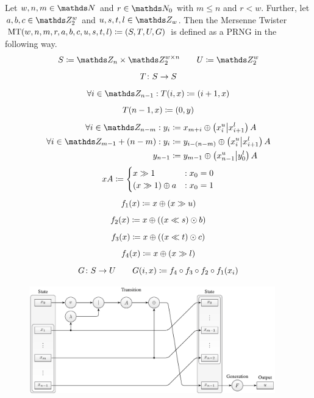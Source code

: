 \documentclass{stdlocal}
\begin{document}
    \begin{definition}
      Let $w, n, m\in \setNatural$ and $r\in\setNatural_0$ with $m \leq n$ and $r < w$.
      Further, let $a,b,c \in \setInteger_2^w$ and $u,s,t,l \in \setInteger_w$.
      Then the Mersenne Twister $\mathrm{MT}(w,n,m,r,a,b,c,u,s,t,l)\coloneqq (S,T,U,G)$ is defined as a PRNG in the following way.
      \[
        S \define \setInteger_n \times \setInteger_2^{w\times n}
        \separate
        U \define \setInteger_2^w
      \]
      \[
        T\colon S\to S
      \]
      \[
        \forall i\in\setInteger_{n-1}: T(i, x) \define (i + 1, x)
      \]
      \[
        T(n-1, x) \coloneqq (0, y)
      \]
      \begin{align*}
        \forall i\in\setInteger_{n-m}: y_i &\define x_{m+i} \oplus \roundBrackets{x_i^u \middle\vert x_{i+1}^l}A \\
        \forall i\in\setInteger_{m-1} + (n-m): y_i &\define y_{i-(n-m)} \oplus \roundBrackets{x_i^u \middle\vert x_{i+1}^l}A \\
        y_{n-1} &\define y_{m-1} \oplus \roundBrackets{x^u_{n-1} \middle\vert y_0^l}A
      \end{align*}
      \[
        xA \coloneqq
        \begin{cases}
          x \gg 1 &: x_0 = 0 \\
          (x \gg 1) \oplus a &: x_0 = 1
        \end{cases}
      \]
      \[
        f_1(x) \coloneqq x \oplus (x \gg u)
      \]
      \[
        f_2(x) \coloneqq x \oplus ((x \ll s) \odot b)
      \]
      \[
        f_3(x) \coloneqq x \oplus ((x \ll t) \odot c)
      \]
      \[
        f_4(x) \coloneqq x \oplus (x \gg l)
      \]
      \[
        G\colon S\to U
        \qquad
        G(i,x) \coloneqq f_4 \circ f_3 \circ f_2 \circ f_1(x_i)
      \]
    \end{definition}

    \begin{figure}
      \center
      \includegraphics[width=0.95\textwidth]{figures/mt19937_scheme.pdf}
      \caption[MT19937 Scheme]{}
      \label{fig:mt19937-scheme}
    \end{figure}
\end{document}
